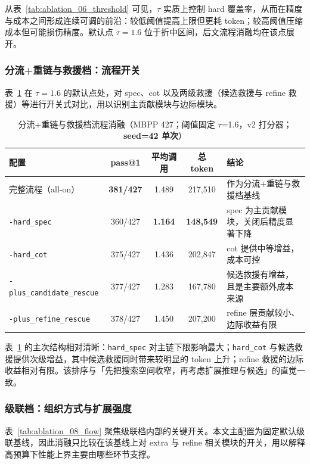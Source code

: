 从表~\ref{tab:ablation_06_threshold} 可见，$\tau$ 实质上控制 hard 覆盖率，从而在精度与成本之间形成连续可调的前沿：较低阈值提高上限但更耗 token；较高阈值压缩成本但可能损伤精度。默认点 $\tau=1.6$ 位于折中区间，后文流程消融均在该点展开。

\subsubsection{分流+重链与救援档：流程开关}

表~\ref{tab:ablation_06_flow} 在 $\tau=1.6$ 的默认点处，对 spec、cot 以及两级救援（候选救援与 refine 救援）等进行开关式对比，用以识别主贡献模块与边际模块。

\begin{table}[htbp]
\centering
\caption{分流+重链与救援档流程消融（MBPP 427；阈值固定 $\tau$=1.6，v2 打分器；\textbf{seed=42 单次}）}
\label{tab:ablation_06_flow}
\begin{tabularx}{\textwidth}{p{3.7cm} c c c X}
\toprule
配置 & pass@1 & 平均调用 & 总 token & 结论 \\
\midrule
完整流程（all-on） & \textbf{381/427} & 1.489 & 217,510 & 作为分流+重链与救援档基线 \\
\texttt{-hard\_spec} & 360/427 & \textbf{1.164} & \textbf{148,549} & spec 为主贡献模块，关闭后精度显著下降 \\
\texttt{-hard\_cot} & 375/427 & 1.436 & 202,847 & cot 提供中等增益，成本可控 \\
\texttt{-plus\_candidate\_rescue} & 377/427 & 1.283 & 167,780 & 候选救援有增益，且是主要额外成本来源 \\
\texttt{-plus\_refine\_rescue} & 378/427 & 1.450 & 207,200 & refine 层贡献较小、边际收益有限 \\
\bottomrule
\end{tabularx}
\end{table}

表~\ref{tab:ablation_06_flow} 的主次结构相对清晰：\texttt{hard\_spec} 对主链下限影响最大；\texttt{hard\_cot} 与候选救援提供次级增益，其中候选救援同时带来较明显的 token 上升；refine 救援的边际收益相对有限。该排序与「先把搜索空间收窄，再考虑扩展推理与候选」的直觉一致。

\subsubsection{级联档：组织方式与扩展强度}

表~\ref{tab:ablation_08_flow} 聚焦级联档内部的关键开关。本文主配置为固定默认级联基线，因此消融只比较在该基线上对 extra 与 refine 相关模块的开关，用以解释高预算下性能上界主要由哪些环节支撑。

